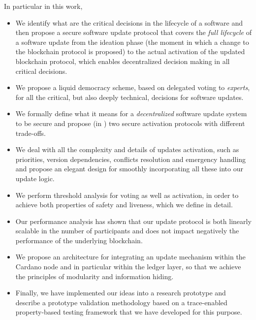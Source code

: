 In particular in this work, 
\begin{itemize}
	\item We identify what are the critical decisions in the lifecycle of a 
	software and then propose a secure software update protocol that covers the 
	\emph{full lifecycle} of a software update from the ideation phase (the 
	moment in which a change to the blockchain protocol is proposed) to the 
	actual activation of the updated blockchain protocol, which enables 
	decentralized decision making in all critical decisions.
	\item We propose a liquid democracy scheme, based on delegated voting to 
	\emph{experts}, for all the critical, but also deeply technical, decisions 
	for software updates.
	\item We formally define what it means for a \emph{decentralized} software 
	update system to be secure and propose (in \cite{secure_activation}) two 
	secure 	activation protocols with different trade-offs.
	\item We deal with all the complexity and details of updates activation, 
	such as priorities, version dependencies, conflicts resolution and 
	emergency handling 
	and propose	an elegant design for smoothly incorporating all these into 
	our update logic.
	\item We perform threshold analysis for voting as well as activation, in 
	order to 	achieve both properties of safety and liveness, which we define 
	in detail.
	\item Our performance analysis has shown that our update protocol is both 
	linearly scalable in the number of participants and does not impact 
	negatively the performance of the underlying blockchain.
	\item We propose an architecture for integrating an update mechanism within 
	the Cardano node \cite{cardano} and in particular within the ledger layer, 
	so that we 
	achieve the principles of modularity and information hiding.
	\item Finally, we have implemented our ideas into a research prototype and 
	describe a  prototype validation methodology based on a trace-enabled 
	property-based testing framework that we have developed for this purpose.
\end{itemize}

